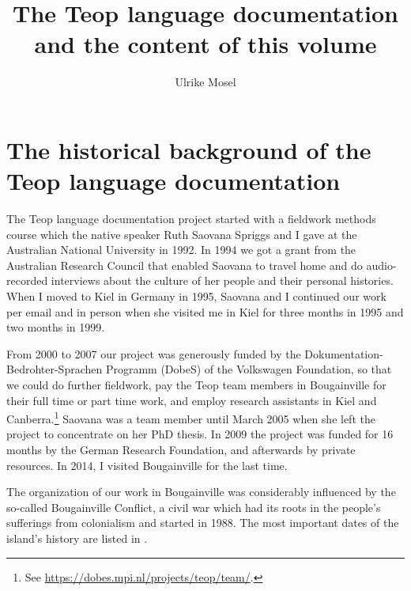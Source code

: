 \documentclass[output=paper]{langscibook}
\title{The Teop language documentation and the content of this volume}
\author{Ulrike Mosel}
\begin{document}
\maketitle\label{chap:2}
\section{The historical background of the Teop language documentation}
The Teop language documentation project started with a fieldwork methods course which the native speaker Ruth Saovana Spriggs and I gave at the Australian National University in 1992. In 1994 we got a grant from the Australian Research Council that enabled Saovana to travel home and do audio-recorded interviews about the culture of her people and their personal histories. When I moved to Kiel in Germany in 1995, Saovana and I continued our work per email and in person when she visited me in Kiel for three months in 1995 and two months in 1999.

From 2000 to 2007 our project was generously funded by the Dokumentation-Bedrohter-Sprachen Programm (DobeS) of the Volkswagen Foundation, so that we could do further fieldwork, pay the Teop team members in Bougainville for their full time or part time work, and employ research assistants in Kiel and Canberra.\footnote{See \url{https://dobes.mpi.nl/projects/teop/team/}.} Saovana was a team member until March 2005 when she left the project to concentrate on her PhD thesis. In 2009 the project was funded for 16 months by the German Research Foundation, and afterwards by private resources. In 2014, I visited Bougainville for the last time. 

The organization of our work in Bougainville was considerably influenced by the so-called Bougainville Conflict, a civil war which had its roots in the people’s sufferings from colonialism and started in 1988. The most important dates of the island’s history are listed in .
\end{document}
